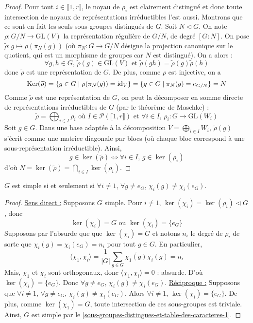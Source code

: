 	\begin{proof}
		Pour tout $i \in \llbracket 1, r \rrbracket$, le noyau de $\rho_i$ est clairement distingué et donc toute intersection de noyaux de représentations irréductibles l'est aussi. Montrons que ce sont en fait les seuls sous-groupes distingués de $G$. Soit $N \lhd G$. On note $\rho : G/N \rightarrow \mathrm{GL}(V)$ la représentation régulière de $G/N$, de degré $[G : N]$. On pose $\widetilde{\rho} : g \mapsto \rho(\pi_N(g))$ (où $\pi_N : G \rightarrow G/N$ désigne la projection canonique sur le quotient, qui est un morphisme de groupes car $N$ est distingué). On a alors :
		\[ \forall g, h \in G, \, \widetilde{\rho}(g) \in \mathrm{GL}(V) \text{ et } \widetilde{\rho}(gh) = \widetilde{\rho}(g) \widetilde{\rho}(h) \]
		donc $\widetilde{\rho}$ est une représentation de $G$. De plus, comme $\rho$ est injective, on a
		\[ \mathrm{Ker}(\widetilde{\rho}) = \{ g \in G \mid \rho(\pi_N(g)) = \operatorname{id}_V \} = \{ g \in G \mid \pi_N(g) = e_{G/N} \} = N \]
		Comme $\widetilde{\rho}$ est une représentation de $G$, on peut la décomposer en somme directe de représentations irréductibles de $G$ (par le théorème de Maschke) :
		\[ \widetilde{\rho} = \bigoplus_{i \in I} \rho_i \text{ où } I \in \mathcal{P}(\llbracket 1, r \rrbracket) \text{ et } \forall i \in I, \, \rho_i : G \rightarrow \mathrm{GL}(W_i) \]
		Soit $g \in G$. Dans une base adaptée à la décomposition $V = \bigoplus_{i \in I} W_i$, $\widetilde{\rho}(g)$ s'écrit comme une matrice diagonale par blocs (où chaque bloc correspond à une sous-représentation irréductible). Ainsi,
		\[ g \in \ker(\widetilde{\rho}) \iff \forall i \in I, \, g \in \ker(\rho_i) \]
		d'où $N = \ker(\widetilde{\rho}) = \bigcap_{i \in I} \ker(\rho_i)$.
	\end{proof}

	\begin{corollary}
		$G$ est simple si et seulement si $\forall i \neq 1$, $\forall g \neq e_G$, $\chi_i(g) \neq \chi_i(e_G)$.
	\end{corollary}

	\begin{proof}
		\uline{Sens direct :} Supposons $G$ simple. Pour $i \neq 1$, $\ker(\chi_i) = \ker(\rho_i) \lhd G$, donc
		\[ \ker(\chi_i) = G \text{ ou } \ker(\chi_i) = \{ e_G \} \]
		Supposons par l'absurde que que $\ker(\chi_i) = G$ et notons $n_i$ le degré de $\rho_i$ de sorte que $\chi_i(g) = \chi_i(e_G) = n_i$ pour tout $g \in G$. En particulier,
		\[ \langle \chi_1, \chi_i \rangle = \frac{1}{|G|} \sum_{g \in G} \overline{\chi_1(g)} \chi_i(g) = n_i \]
		Mais, $\chi_1$ et $\chi_i$ sont orthogonaux, donc $\langle \chi_1, \chi_i \rangle = 0$ : absurde. D'où $\ker(\chi_i) = \{ e_G \}$. Donc $\forall g \neq e_G$, $\chi_i(g) \neq \chi_i(e_G)$.
		\newpar
		\uline{Réciproque :} Supposons que $\forall i \neq 1$, $\forall g \neq e_G$, $\chi_i(g) \neq \chi_i(e_G)$. Alors $\forall i \neq 1$, $\ker(\chi_i) = \{ e_G \}$. De plus, comme $\ker(\chi_1) = G$, toute intersection de ces sous-groupes est triviale. Ainsi, $G$ est simple par le \cref{sous-groupes-distingues-et-table-des-caracteres-1}.
	\end{proof}


